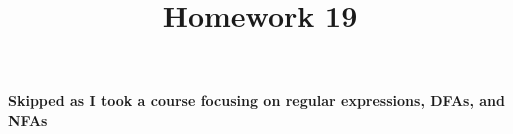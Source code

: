 \documentclass{article}
\begin{document}
\title{Homework 19}
\date{}
\maketitle

\paragraph{\Large Skipped as I took a course focusing on regular expressions, DFAs, and NFAs}
\end{document}
